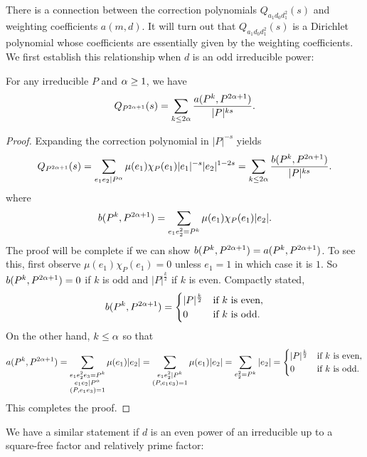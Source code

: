 \documentclass[12pt,reqno,oneside]{amsart}
\begin{document}
    There is a connection between the correction polynomials $Q_{a_{1}d_{0}d_{1}^{2}}(s)$ and weighting coefficients $a(m,d)$. It will turn out that $Q_{a_{1}d_{0}d_{1}^{2}}(s)$ is a Dirichlet polynomial whose coefficients are essentially given by the weighting coefficients. We first establish this relationship when $d$ is an odd irreducible power:

    \begin{lemma}\label{lem:prime_correction_odd}
        For any irreducible $P$ and $\alpha \ge 1$, we have
        \[
            Q_{P^{2\alpha+1}}(s) = \sum_{k \le 2\alpha}\frac{a(P^{k},P^{2\alpha+1})}{|P|^{ks}}.
        \]
    \end{lemma}
    \begin{proof}
        Expanding the correction polynomial in $|P|^{-s}$ yields
        \[
            Q_{P^{2\alpha+1}}(s) = \sum_{e_{1}e_{2} \mid P^{\alpha}}\mu(e_{1})\chi_{P}(e_{1})|e_{1}|^{-s}|e_{2}|^{1-2s} = \sum_{k \le 2\alpha}\frac{b(P^{k},P^{2\alpha+1})}{|P|^{ks}}.
        \]
        where
        \[
            b(P^{k},P^{2\alpha+1}) = \sum_{e_{1}e_{2}^{2} = P^{k}}\mu(e_{1})\chi_{P}(e_{1})|e_{2}|.
        \]
        The proof will be complete if we can show $b(P^{k},P^{2\alpha+1}) = a(P^{k},P^{2\alpha+1})$. To see this, first observe $\mu(e_{1})\chi_{P}(e_{1}) = 0$ unless $e_{1} = 1$ in which case it is $1$. So $b(P^{k},P^{2\alpha+1}) = 0$ if $k$ is odd and $|P|^{\frac{k}{2}}$ if $k$ is even. Compactly stated,
        \[
            b(P^{k},P^{2\alpha+1}) = \begin{cases} |P|^{\frac{k}{2}} & \text{if $k$ is even}, \\ 0 & \text{if $k$ is odd}. \end{cases}
        \]
        On the other hand, $k \le \alpha$ so that
        \[
            a(P^{k},P^{2\alpha+1}) = \sum_{\substack{e_{1}e_{2}^{2}e_{3} = P^{k} \\ e_{1}e_{2} \mid P^{\alpha} \\ (P,e_{1}e_{3}) = 1}}\mu(e_{1})|e_{2}| = \sum_{\substack{e_{1}e_{2}^{2} \mid P^{k} \\ (P,e_{1}e_{3}) = 1}}\mu(e_{1})|e_{2}| = \sum_{e_{2}^{2} = P^{k}}|e_{2}| =  \begin{cases} |P|^{\frac{k}{2}} & \text{if $k$ is even}, \\ 0 & \text{if $k$ is odd}. \end{cases}
        \]
        This completes the proof.
    \end{proof}

    We have a similar statement if $d$ is an even power of an irreducible up to a square-free factor and relatively prime factor:
    
\end{document}

